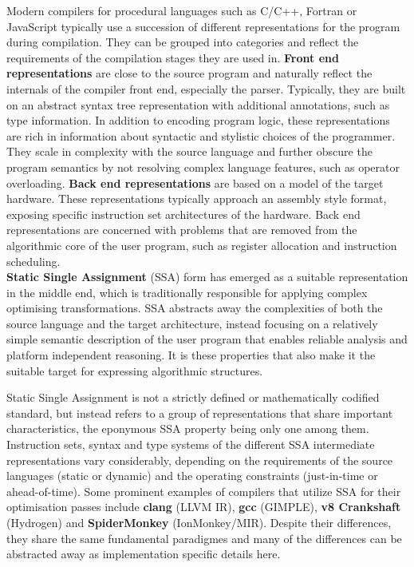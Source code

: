     Modern compilers for procedural languages such as
    C/C++, Fortran or JavaScript typically use a succession of different
    representations for the program during compilation.
    They can be grouped into categories and reflect the requirements of
    the compilation stages they are used in.
    \linebreak
    {\bf Front end representations} are close to the source program and
    naturally reflect the internals of the compiler front end, especially the
    parser.
    Typically, they are built on an abstract syntax tree representation with
    additional annotations, such as type information.
    In addition to encoding program logic, these representations are rich in
    information about syntactic and  stylistic choices of the programmer.
    They scale in complexity with the source language and further obscure the
    program semantics by not resolving complex language features, such as
    operator overloading.
    \linebreak
    {\bf Back end representations} are based on a model of the target hardware.
    These representations typically approach an assembly style format,
    exposing specific instruction set architectures of the hardware.
    Back end representations are concerned with problems that are removed from
    the algorithmic core of the user program, such as register allocation and
    instruction scheduling.
    \\
    {\bf Static Single Assignment} (SSA) form has emerged as a suitable
    representation in the middle end, which is traditionally responsible for
    applying complex optimising transformations.
    SSA abstracts away the complexities of both the source language and the
    target architecture, instead focusing on a relatively simple semantic
    description of the user program that enables reliable analysis and platform
    independent reasoning.
    It is these properties that also make it the suitable target for expressing
    algorithmic structures.

    Static Single Assignment is not a strictly defined or mathematically
    codified standard, but instead refers to a group of representations that
    share important characteristics,
    the eponymous SSA property being only one among them.
    Instruction sets, syntax and type systems of the different
    SSA intermediate representations vary considerably, depending on the
    requirements of the source languages (static or dynamic)
    and the operating constraints (just-in-time or ahead-of-time).
    Some prominent examples of compilers that utilize SSA for their
    optimisation passes include {\bf clang} (LLVM IR), {\bf gcc} (GIMPLE),
    {\bf v8 Crankshaft} (Hydrogen) and {\bf SpiderMonkey} (IonMonkey/MIR).
    Despite their differences, they share the same fundamental paradigmes
    and many of the differences can be abstracted away as implementation
    specific details here.

